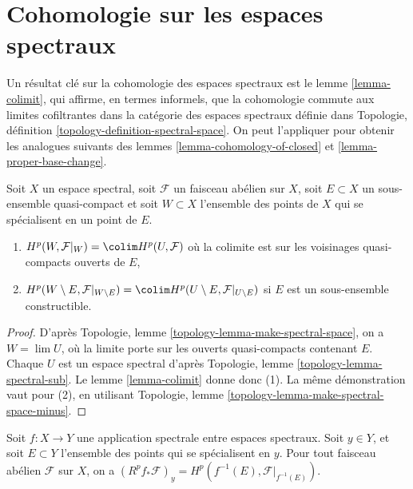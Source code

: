 \section{Cohomologie sur les espaces spectraux}

\label{section-spectral}

\noindent
Un résultat clé sur la cohomologie des espaces spectraux est le lemme \ref{lemma-colimit}, qui affirme, en termes informels, que la cohomologie commute aux limites cofiltrantes dans la catégorie des espaces spectraux définie dans Topologie, définition \ref{topology-definition-spectral-space}. On peut l'appliquer pour obtenir les analogues suivants des lemmes \ref{lemma-cohomology-of-closed} et \ref{lemma-proper-base-change}.

\begin{lemma}

\label{lemma-cohomology-of-neighbourhoods-of-closed}
Soit $X$ un espace spectral, soit $\mathcal{F}$ un faisceau abélien sur $X$, soit $E \subset X$ un sous-ensemble quasi-compact et soit $W \subset X$ l'ensemble des points de $X$ qui se spécialisent en un point de $E$.
\begin{enumerate}
\item $H^p(W, \mathcal{F}|_W) = \colim H^p(U, \mathcal{F})$ où la colimite est sur les voisinages quasi-compacts ouverts de $E$,
\item $H^p(W \setminus E, \mathcal{F}|_{W \setminus E}) =
\colim H^p(U \setminus E, \mathcal{F}|_{U \setminus E})$ si $E$ est un sous-ensemble constructible.
\end{enumerate}

\end{lemma}

\begin{proof}
D'après Topologie, lemme \ref{topology-lemma-make-spectral-space}, on a $W = \lim U$, où la limite porte sur les ouverts quasi-compacts contenant $E$. Chaque $U$ est un espace spectral d'après Topologie, lemme \ref{topology-lemma-spectral-sub}. Le lemme \ref{lemma-colimit} donne donc (1). La même démonstration vaut pour (2), en utilisant Topologie, lemme \ref{topology-lemma-make-spectral-space-minus}.
\end{proof}

\begin{lemma}

\label{lemma-proper-base-change-spectral}
Soit $f : X \to Y$ une application spectrale entre espaces spectraux. Soit $y \in Y$, et soit $E \subset Y$ l'ensemble des points qui se spécialisent en $y$. Pour tout faisceau abélien $\mathcal{F}$ sur $X$, on a $(R^pf_*\mathcal{F})_y = H^p(f^{-1}(E), \mathcal{F}|_{f^{-1}(E)})$.
\end{lemma}

